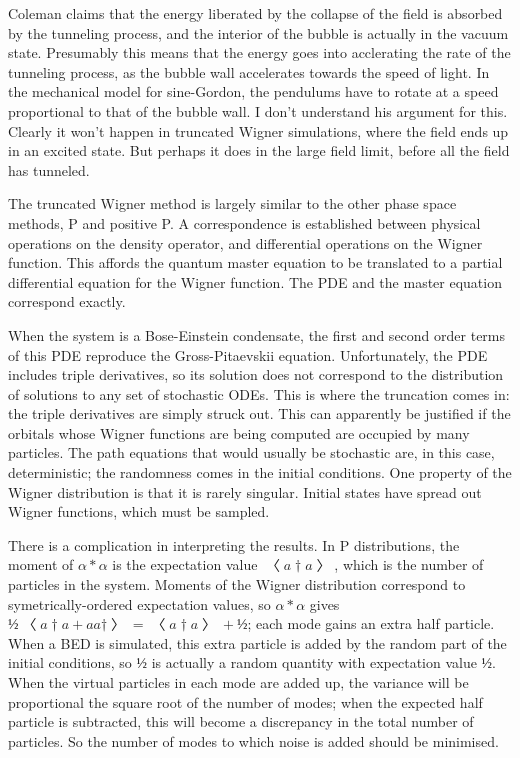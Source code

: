 Coleman claims that the energy liberated by the collapse of the field is absorbed by the tunneling process, and the interior of the bubble is actually in the vacuum state.  Presumably this means that the energy goes into acclerating the rate of the tunneling process, as the bubble wall accelerates towards the speed of light.  In the mechanical model for sine-Gordon, the pendulums have to rotate at a speed proportional to that of the bubble wall.  I don't understand his argument for this.  Clearly it won't happen in truncated Wigner simulations, where the field ends up in an excited state.  But perhaps it does in the large field limit, before all the field has tunneled.
 



The truncated Wigner method is largely similar to the other phase space methods, P and positive {P}.  A correspondence is established between physical operations on the density operator, and differential operations on the Wigner function.  This affords the quantum master equation to be translated to a partial differential equation for the Wigner function.  The PDE and the master equation correspond exactly.

When the system is a Bose-Einstein condensate, the first and second order terms of this PDE reproduce the Gross-Pitaevskii equation.  Unfortunately, the PDE includes triple derivatives, so its solution does not correspond to the distribution of solutions to any set of stochastic ODEs.  This is where the truncation comes in: the triple derivatives are simply struck out.  This can apparently be justified if the orbitals whose Wigner functions are being computed are occupied by many particles.  The path equations that would usually be stochastic are, in this case, deterministic; the randomness comes in the initial conditions.  One property of the Wigner distribution is that it is rarely singular.  Initial states have spread out Wigner functions, which must be sampled.

There is a complication in interpreting the results.  In P distributions, the moment of $α*α$ is the expectation value $〈a†a〉$, which is the number of particles in the system.  Moments of the Wigner distribution correspond to symetrically-ordered expectation values, so $α*α$ gives $½〈a†a+aa†〉=〈a†a〉+½$; each mode gains an extra half particle.  When a BED is simulated, this extra particle is added by the random part of the initial conditions, so $½$ is actually a random quantity with expectation value $½$.  When the virtual particles in each mode are added up, the variance will be proportional the square root of the number of modes; when the expected half particle is subtracted, this will become a discrepancy in the total number of particles.  So the number of modes to which noise is added should be minimised.

